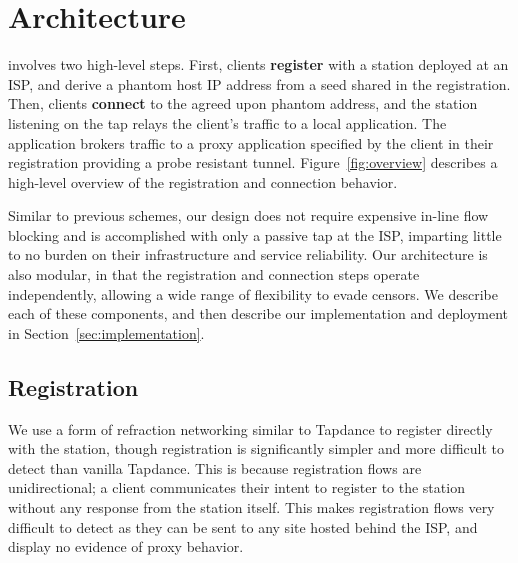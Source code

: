 \documentclass[sigconf]{acmart}
\begin{document}


\section{Architecture}
\label{sec:architecture}

\scheme involves two high-level steps. First, clients \textbf{register} with a 
\scheme station deployed at an ISP, and derive a phantom host IP address from 
a seed shared in the registration. Then, clients \textbf{connect} 
to the agreed upon phantom address, and the station listening on the tap 
relays the client's traffic to a local application. The application brokers 
traffic to a proxy application specified by the client in their registration 
providing a probe resistant tunnel. Figure~\ref{fig:overview} describes a 
high-level overview of the \scheme registration and connection behavior.

Similar to previous schemes, our design does not require expensive in-line
flow blocking and is accomplished with only a passive tap at the ISP, imparting
little to no burden on their infrastructure and service reliability.
Our architecture is also modular, in that the registration and connection steps operate
independently, allowing a wide range of flexibility to evade censors. We
describe each of these components, and then describe our implementation and
deployment in Section~\ref{sec:implementation}.

\FigOverview

\subsection{Registration}
\label{sec:registration}
We use a form of refraction networking similar to Tapdance to register directly with
the station, though \scheme registration is significantly simpler and more difficult
to detect than vanilla Tapdance. This is because registration flows are unidirectional; 
a client communicates their intent to register to the station without any 
response from the station itself. This makes registration flows very difficult to detect as they 
can be sent to any site hosted behind the ISP, and display no evidence of proxy behavior. 
\end{document}
